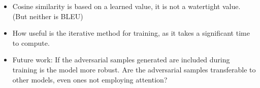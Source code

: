 \begin{itemize}
    \item Cosine similarity is based on a learned value, it is not a watertight value. (But neither is BLEU)
    \item How useful is the iterative method for training, as it takes a significant time to compute.
    \item Future work:
          \subitem If the adversarial samples generated are included during training is the model more robust.
          \subitem Are the adversarial samples transferable to other models, even ones not employing attention?
\end{itemize}
